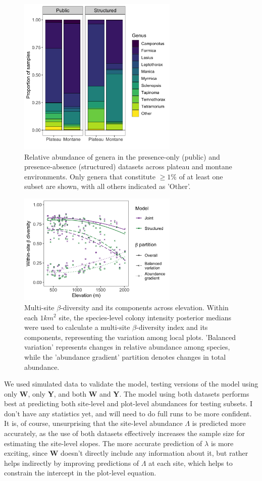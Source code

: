 \documentclass[preprint,review,times,12pt]{elsarticle}
\begin{document}
\begin{figure}
	\centering\includegraphics[width=3in]{figs/genus_assemblages.png}
	\caption{\label{fig:genus_assemblages} Relative abundance of genera in the presence-only (public) and presence-absence (structured) datasets across plateau and montane environments. Only genera that constitute $\geq 1\%$ of at least one subset are shown, with all others indicated as 'Other'.}
\end{figure}

\begin{figure}
\centering\includegraphics[width=3in]{figs/beta_diversity.png}
\caption{\label{fig:beta_div} Multi-site $\beta$-diversity and its components across elevation. Within each $1 km^2$ site, the species-level colony intensity posterior medians were used to calculate a multi-site $\beta$-diversity index and its components, representing the variation among local plots. 'Balanced variation' represents changes in relative abundance among species, while the 'abundance gradient' partition denotes changes in total abundance.}
\end{figure}

We used simulated data to validate the model, testing versions of the model using only \textbf{W}, only \textbf{Y}, and both \textbf{W} and \textbf{Y}. The model using both datasets performs best at predicting both site-level and plot-level abundances for testing subsets. I don't have any statistics yet, and will need to do full runs to be more confident. It is, of course, unsurprising that the site-level abundance $\Lambda$ is predicted more accurately, as the use of both datasets effectively increases the sample size for estimating the site-level slopes. The more accurate prediction of $\lambda$ is more exciting, since \textbf{W} doesn't directly include any information about it, but rather helps indirectly by improving predictions of $\Lambda$ at each site, which helps to constrain the intercept in the plot-level equation. 
\end{document}
